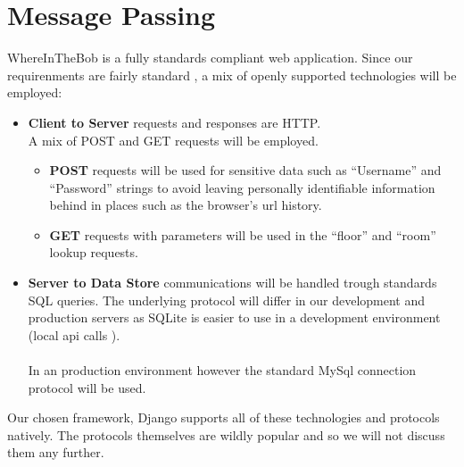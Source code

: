 \documentclass{sig-alt-release2}
\begin{document}
\section{Message Passing}


WhereInTheBob is a fully standards compliant web application.
Since our requirenments are fairly standard , a mix of openly supported 
technologies will be employed:

\begin{itemize}\itemsep1pt \parskip0pt 
\item \textbf{ Client to Server } requests and responses are HTTP.
\\ A mix of POST and GET requests will be employed. 
	\begin{itemize}\itemsep1pt \parskip0pt 
		\item \textbf{POST} requests will be used for sensitive data such as 
		``Username'' and ``Password'' strings
		to avoid leaving personally identifiable information behind in places
		such as the browser's url history.
		\item \textbf{GET} requests with parameters will be used in the
		``floor'' and ``room'' lookup requests. 
	\end{itemize}

\item \textbf{Server to Data Store } communications will be handled trough standards SQL queries.
The underlying protocol will differ in our development and production servers
as SQLite is easier to use in a development environment (local api calls ). \\
\\
In an production environment however the standard MySql connection protocol will
be used.
\end{itemize}
Our chosen framework, Django supports all of these technologies and protocols
natively. The protocols themselves are wildly popular and so we will not discuss
them any further.



\end{document}
